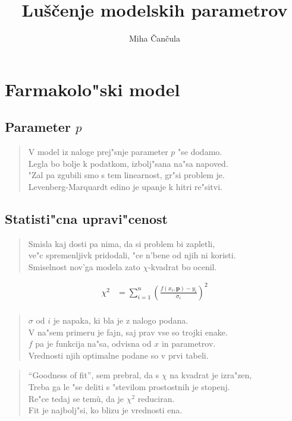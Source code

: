 \documentclass[a4paper,10pt]{article}
\title{Lu\v s\v cenje modelskih parametrov}
\author{Miha \v Can\v cula}
\begin{document}
\maketitle

\section{Farmakolo"ski model}
\subsection{Parameter $p$}

\begin{verse}
V model iz naloge prej"snje parameter $p$ "se dodamo. \\ 
Legla bo bolje k podatkom, izbolj"sana na"sa napoved. \\
"Zal pa zgubili smo s tem linearnost, gr"si problem je. \\
Levenberg-Marquardt edino je upanje k hitri re"sitvi.
\end{verse}

\subsection{Statisti"cna upravi"cenost}
\begin{verse}
 Smisla kaj dosti pa nima, da si problem bi zapletli, \\
 ve"c spremenljivk pridodali, "ce n'bene od njih ni koristi. \\
 Smiselnost nov'ga modela zato $\chi$-kvadrat bo ocenil. 
\end{verse}

\begin{align}
 \chi^2 &= \sum_{i=1}^n \left(\frac{f(x_i, \mathbf{p}) - y_i}{\sigma_i}\right)^2 \\
\end{align}

\begin{verse}
 $\sigma$ od $i$ je napaka, ki bla je z nalogo podana. \\
 V na"sem primeru je fajn, saj prav vse so trojki enake. \\
 $f$ pa je funkcija na"sa, odvisna od $x$ in parametrov. \\
 Vrednosti njih optimalne podane so v prvi tabeli. \\ 
\end{verse}

\begin{verse}
 ``Goodness of fit'', sem prebral, da s $\chi$ na kvadrat je izra"zen, \\
Treba ga le "se deliti s "stevilom prostostnih je stopenj. \\
Re"ce tedaj se tem\`u, da je $\chi^2$ reduciran. \\
Fit je najbolj"si, ko blizu je vrednosti ena. \\
\end{verse}
\end{document}
